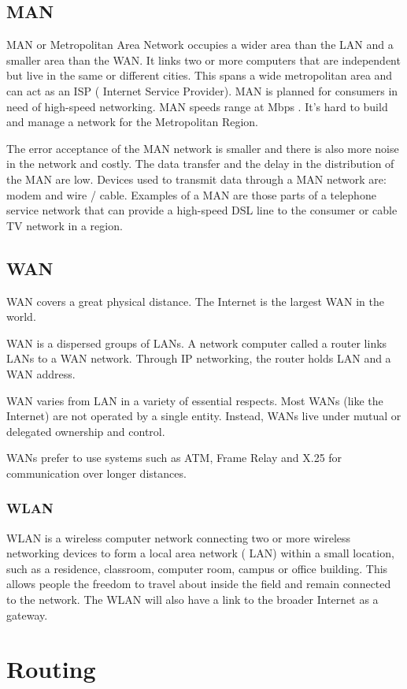 \documentclass[12pt]{article}
\begin{document}
\subsection{MAN}
 MAN or Metropolitan Area Network occupies a wider area than the LAN and a smaller area than the WAN. It links two or more computers that are independent but live in the same or different cities. This spans a wide metropolitan area and can act as an ISP ( Internet Service Provider). MAN is planned for consumers in need of high-speed networking. MAN speeds range at Mbps . It's hard to build and manage a network for the Metropolitan Region. 

The error acceptance of the MAN network is smaller and there is also more noise in the network and costly. The data transfer and the delay in the distribution of the MAN are low. Devices used to transmit data through a MAN network are: modem and wire / cable. Examples of a MAN are those parts of a telephone service network that can provide a high-speed DSL line to the consumer or cable TV network in a region.
\subsection{WAN}
WAN covers a great physical distance. The Internet is the largest WAN in the world. 

WAN is a dispersed groups of LANs. A network computer called a router links LANs to a WAN network. Through IP networking, the router holds LAN and a WAN address. 

WAN varies from LAN in a variety of essential respects. Most WANs (like the Internet) are not operated by a single entity. Instead, WANs live under mutual or delegated ownership and control. 

WANs prefer to use systems such as ATM, Frame Relay and X.25 for communication over longer distances.
\subsubsection{WLAN}
WLAN is a wireless computer network connecting two or more wireless networking devices to form a local area network ( LAN) within a small location, such as a residence, classroom, computer room, campus or office building. This allows people the freedom to travel about inside the field and remain connected to the network. The WLAN will also have a link to the broader Internet as a gateway. \cite{11}
\section{Routing}
\end{document}

